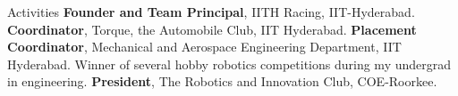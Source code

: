 \begin{rubric}{Activities}
\entry*[2013-2020] \textbf{Founder and Team Principal}, IITH Racing, IIT-Hyderabad. 
\entry*[2014-2015] \textbf{Coordinator}, Torque, the Automobile Club, IIT Hyderabad. 
\entry*[2013-2014] \textbf{Placement Coordinator}, Mechanical and Aerospace Engineering Department, IIT Hyderabad. 
\entry*[2008-2011] Winner of several hobby robotics competitions during my undergrad in engineering.
\entry*[2010-2011] \textbf{President}, The Robotics and Innovation Club, COE-Roorkee.
\end{rubric}


